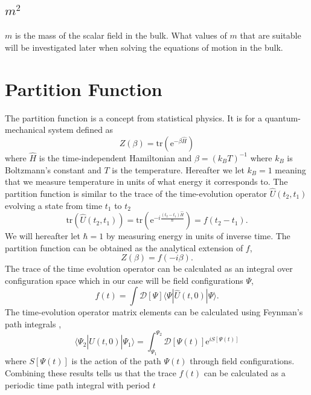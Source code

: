 \documentclass[12pt]{report}
\newcommand{\e}{\ensuremath{\mathrm{e}}}
\renewcommand{\i}{\ensuremath{i}}
\newcommand{\ket}[1]{|#1\rangle}
\newcommand{\bra}[1]{\langle#1|}
\newcommand{\bracket}[3]{\bra{#1}#2\ket{#3}}
\begin{document}
\subsection{$m^2$}
$m$ is the mass of the scalar field in the bulk. What values of $m$ that are suitable will be investigated later when solving the equations of motion in the bulk.



\section{Partition Function}
The partition function is a concept from statistical physics. It is for a quantum-mechanical system defined as
\begin{equation}
 Z(\beta)=\mathrm{tr}(\e^{-\beta\hat{H}})
\end{equation}
where $\hat{H}$ is the time-independent Hamiltonian and $\beta=(k_BT)^{-1}$ where $k_B$ is Boltzmann's constant and $T$ is the temperature. Hereafter we let $k_B=1$ meaning that we measure temperature in units of what energy it corresponds to. The partition function is similar to the trace of the time-evolution operator $\hat{U}(t_2,t_1)$ evolving a state from time $t_1$ to $t_2$
\begin{equation}
 \mathrm{tr}(\hat{U}(t_2,t_1))=\mathrm{tr}(\e^{-\i\frac{(t_2-t_1)\hat{H}}{\hbar}})=f(t_2-t_1).
\end{equation}
We will hereafter let $\hbar=1$ by measuring energy in units of inverse time. The partition function can be obtained as the analytical extension of $f$,
\begin{equation}
 Z(\beta)=f(-\i\beta).
\end{equation}
The trace of the time evolution operator can be calculated as an integral over configuration space which in our case will be field configurations $\Psi$,
\begin{equation}
 f(t)=\int \mathcal{D}[\Psi] \bracket{\Psi}{\hat{U}(t,0)}{\Psi}.
\end{equation}
The time-evolution operator matrix elements can be calculated using Feynman's path integrals \cite{feynman1965quantum},
\begin{equation}
 \bracket{\Psi_2}{\hat{U}(t,0)}{\Psi_1}=\int_{\Psi_1}^{\Psi_2} \mathcal{D}[\Psi(t)]\e^{\i S[\Psi(t)]}
\end{equation}
where $S[\Psi(t)]$ is the action of the path $\Psi(t)$ through field configurations. Combining these results tells us that the trace $f(t)$ can be calculated as a periodic time path integral with period $t$
\end{document}

